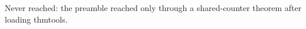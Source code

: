 \documentclass{article}
\begin{document}
Never reached: the preamble reached only through  a
shared-counter theorem after loading thmtools.
\end{document}
